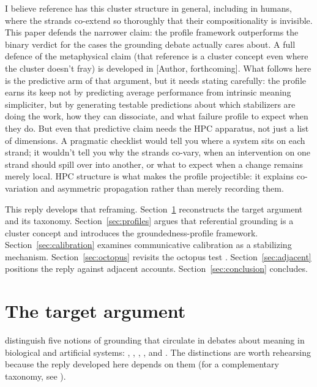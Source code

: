 \documentclass[12pt]{article}
\begin{document}
I believe reference has this cluster structure in general, including in humans, where the strands co-extend so thoroughly that their compositionality is invisible. This paper defends the narrower claim: the profile framework outperforms the binary verdict for the cases the grounding debate actually cares about. A full defence of the metaphysical claim (that reference is a cluster concept even where the cluster doesn't fray) is developed in [Author, forthcoming]. What follows here is the predictive arm of that argument, but it needs stating carefully: the profile earns its keep not by predicting average performance from intrinsic meaning simpliciter, but by generating testable predictions about which stabilizers are doing the work, how they can dissociate, and what failure profile to expect when they do. But even that predictive claim needs the HPC apparatus, not just a list of dimensions. A pragmatic checklist would tell you where a system sits on each strand; it wouldn't tell you why the strands co-vary, when an intervention on one strand should spill over into another, or what to expect when a change remains merely local. HPC structure is what makes the profile projectible: it explains co-variation and asymmetric propagation rather than merely recording them.

This reply develops that reframing. Section~\ref{sec:target} reconstructs the target argument and its taxonomy. Section~\ref{sec:profiles} argues that referential grounding is a cluster concept and introduces the groundedness-profile framework. Section~\ref{sec:calibration} examines communicative calibration as a stabilizing mechanism. Section~\ref{sec:octopus} revisits the octopus test \citep{bender_koller_2020_climbing_towards_nlu}. Section~\ref{sec:adjacent} positions the reply against adjacent accounts. Section~\ref{sec:conclusion} concludes.

\section{The target argument}
\label{sec:target}

\textcite{coelho_mollo_milliere_2026_vector_grounding_problem} distinguish five notions of grounding that circulate in debates about meaning in biological and artificial systems: , , , , and . The distinctions are worth rehearsing because the reply developed here depends on them (for a complementary taxonomy, see \citealt{pavlick_2023_symbols_and_grounding_llms}).
\end{document}
